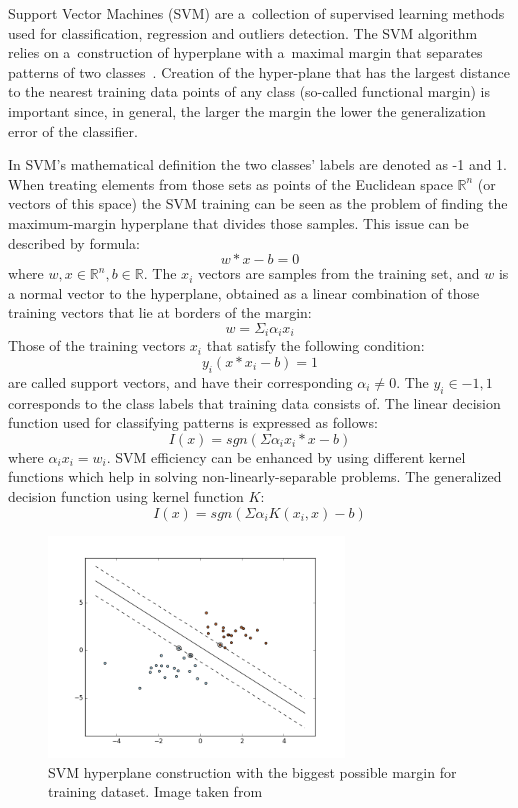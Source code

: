Support Vector Machines (SVM) are a~collection of supervised learning methods used for classification, regression and outliers detection. The SVM algorithm relies on a~construction of hyperplane with a~maximal margin that separates patterns of two classes~\cite{CortesVapnik1995}. Creation of the hyper-plane that has the largest distance to the nearest training data points of any class (so-called functional margin) is important since, in general, the larger the margin the lower the generalization error of the classifier.

In SVM's mathematical definition the two classes' labels are denoted as -1 and 1. When treating elements from those sets as points of the Euclidean space $\mathbb{R}^{n}$ (or vectors of this space) the SVM training can be seen as the problem of finding the maximum-margin hyperplane that divides those samples. This issue can be described by formula: \[ w * x - b = 0 \] where $w, x \in \mathbb{R}^{n}, b \in \mathbb{R}$. The $x_{i}$ vectors are samples from the training set, and $w$ is a normal vector to the hyperplane, obtained as a linear combination of those training vectors that lie at borders of the margin: \[ w = \Sigma_{i}\alpha_{i}x_{i} \] Those of the training vectors $x_{i}$ that satisfy the following condition: \[ y_{i}(x * x_{i} - b) = 1\] are called support vectors, and have their corresponding $\alpha_{i} \neq 0$. The $y_{i} \in {-1, 1}$ corresponds to the class labels that training data consists of. The linear decision function used for classifying patterns is expressed as follows: \[I(x) = sgn(\Sigma\alpha_{i}x_{i} * x - b)\] where $\alpha_{i}x_{i} = w_{i}$. SVM efficiency can be enhanced by using different kernel functions which help in solving non-linearly-separable problems. The generalized decision function using kernel function $K$: \[I(x) = sgn(\Sigma\alpha_{i}K(x_{i},x) - b)\]

\begin{figure}[htp]
	\centering
	\includegraphics[width=0.7\textwidth]{Figures/svm_hyperplane_margin.png}
	\caption{SVM hyperplane construction with the biggest possible margin for training dataset. Image taken from \cite{Scikit-Learn_Website}}
	\label{fig:svm_hyperplane_margin}\vspace{-3pt}
\end{figure}


